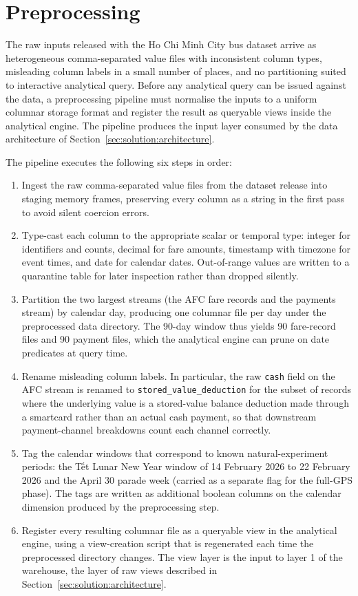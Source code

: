 \section{Preprocessing}
\label{sec:solution:preprocessing}

The raw inputs released with the Ho Chi Minh City bus dataset arrive as
heterogeneous comma-separated value files with inconsistent column types,
misleading column labels in a small number of places, and no partitioning
suited to interactive analytical query. Before any analytical query can be
issued against the data, a preprocessing pipeline must normalise the inputs
to a uniform columnar storage format and register the result as queryable
views inside the analytical engine. The pipeline produces the input layer
consumed by the data architecture of
Section~\ref{sec:solution:architecture}.

The pipeline executes the following six steps in order:

\begin{enumerate}
  \item Ingest the raw comma-separated value files from the dataset release into staging memory frames, preserving every column as a string in the first pass to avoid silent coercion errors.
  \item Type-cast each column to the appropriate scalar or temporal type: integer for identifiers and counts, decimal for fare amounts, timestamp with timezone for event times, and date for calendar dates. Out-of-range values are written to a quarantine table for later inspection rather than dropped silently.
  \item Partition the two largest streams (the AFC fare records and the payments stream) by calendar day, producing one columnar file per day under the preprocessed data directory. The 90-day window thus yields 90 fare-record files and 90 payment files, which the analytical engine can prune on date predicates at query time.
  \item Rename misleading column labels. In particular, the raw \texttt{cash} field on the AFC stream is renamed to \texttt{stored\_value\_deduction} for the subset of records where the underlying value is a stored-value balance deduction made through a smartcard rather than an actual cash payment, so that downstream payment-channel breakdowns count each channel correctly.
  \item Tag the calendar windows that correspond to known natural-experiment periods: the Tết Lunar New Year window of 14 February 2026 to 22 February 2026 and the April 30 parade week (carried as a separate flag for the full-GPS phase). The tags are written as additional boolean columns on the calendar dimension produced by the preprocessing step.
  \item Register every resulting columnar file as a queryable view in the analytical engine, using a view-creation script that is regenerated each time the preprocessed directory changes. The view layer is the input to layer 1 of the warehouse, the layer of raw views described in Section~\ref{sec:solution:architecture}.
\end{enumerate}

